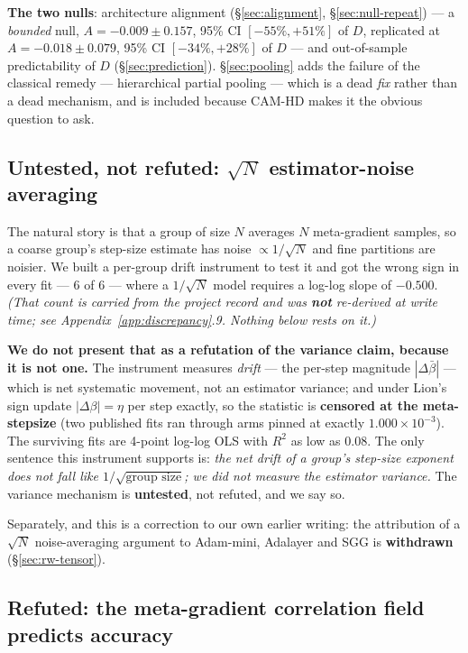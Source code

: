 \documentclass[10pt,letterpaper]{article}
\newcommand{\Dstat}{D}                         %
\newcommand{\Astat}{A}                         %
\begin{document}
\textbf{The two nulls}: architecture alignment (\S\ref{sec:alignment}, \S\ref{sec:null-repeat})
--- a \emph{bounded} null, $\Astat = -0.009 \pm 0.157$, 95\% CI $[-55\%, +51\%]$ of $\Dstat$,
replicated at $\Astat = -0.018 \pm 0.079$, 95\% CI $[-34\%, +28\%]$ of $\Dstat$ --- and
out-of-sample predictability of $\Dstat$
(\S\ref{sec:prediction}). \S\ref{sec:pooling} adds the failure of the classical remedy ---
hierarchical partial pooling --- which is a dead \emph{fix} rather than a dead mechanism, and is
included because CAM-HD makes it the obvious question to ask.

\subsection{Untested, not refuted: \texorpdfstring{$\sqrt{N}$}{sqrt(N)} estimator-noise averaging}
\label{sec:sqrtn}

The natural story is that a group of size $N$ averages $N$ meta-gradient samples, so a coarse
group's step-size estimate has noise $\propto 1/\sqrt{N}$ and fine partitions are noisier. We
built a per-group drift instrument to test it and got the wrong sign in every fit --- 6 of 6 ---
where a $1/\sqrt{N}$ model requires a log-log slope of $-0.500$. \emph{(That count is carried from
the project record and was \textbf{not} re-derived at write time; see
Appendix~\ref{app:discrepancy}.9. Nothing below rests on it.)}

\textbf{We do not present that as a refutation of the variance claim, because it is not one.} The
instrument measures \emph{drift} --- the per-step magnitude $|\Delta\bar{\beta}|$ --- which is net
systematic movement, not an estimator variance; and under Lion's sign update $|\Delta\beta| = \eta$
per step exactly, so the statistic is \textbf{censored at the meta-stepsize} (two published fits
ran through arms pinned at exactly $1.000\times10^{-3}$). The surviving fits are 4-point log-log
OLS with $R^2$ as low as 0.08. The only sentence this instrument supports is: \emph{the net drift
of a group's step-size exponent does not fall like $1/\sqrt{\text{group size}}$; we did not measure
the estimator variance.} The variance mechanism is \textbf{untested}, not refuted, and we say so.

Separately, and this is a correction to our own earlier writing: the attribution of a $\sqrt{N}$
noise-averaging argument to Adam-mini, Adalayer and SGG is \textbf{withdrawn}
(\S\ref{sec:rw-tensor}).

\subsection{Refuted: the meta-gradient correlation field predicts accuracy}
\label{sec:field}
\end{document}

